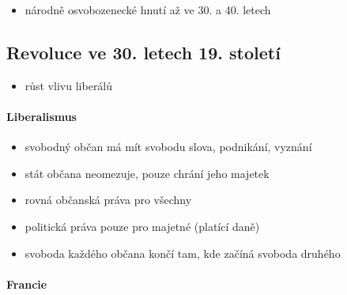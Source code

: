 \begin{itemize}
\item národně osvobozenecké hnutí až ve 30. a 40. letech
\end{itemize}



\subsection{Revoluce ve 30. letech 19. století}
\begin{itemize}
\item růst vlivu liberálů
\end{itemize}

\paragraph{Liberalismus}
\begin{itemize}
\item svobodný občan má mít svobodu slova, podnikání, vyznání
\item stát občana neomezuje, pouze chrání jeho majetek
\item rovná občanská práva pro všechny
\item politická práva pouze pro majetné (platící daně)
\item svoboda každého občana končí tam, kde začíná svoboda druhého
\end{itemize}

\paragraph{Francie}

